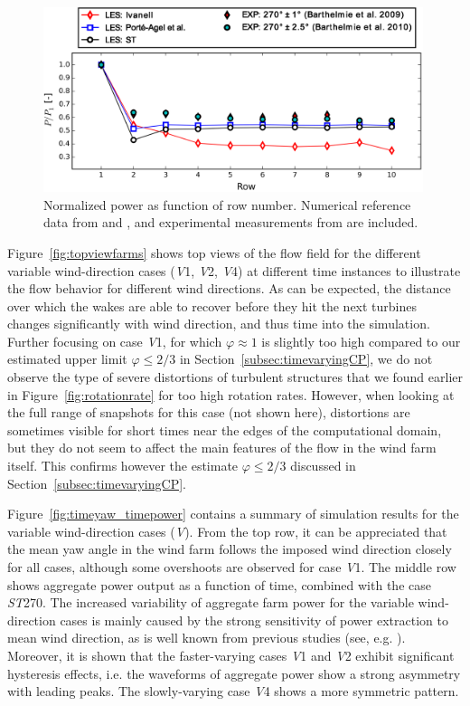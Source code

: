 		\begin{figure}[ht]
			\centering
			\includegraphics[width=0.99\textwidth]{chapters/turbulent_inflow/blm/figure10.eps}
			\caption{Normalized power as function of row number.
				Numerical reference data from \cite{ivanell2009numerical} and \cite{porte2013numerical}, and experimental measurements from \cite{barthelmie2009modelling, barthelmie2010quantifying} are included. }
			\label{fig:hornsrevsteady}
		\end{figure}
		
		Figure~\ref{fig:topviewfarms} shows top views of the flow field for the different variable wind-direction cases (\emph{V}1, \emph{V}2, \emph{V}4) at different time instances to illustrate the flow behavior for different wind directions. As can be expected, the distance over which the wakes are able to recover before they hit the next turbines changes significantly with wind direction, and thus time into the simulation. Further focusing on case \emph{V}1, for which $\varphi\approx 1$ is slightly too high compared to our estimated upper limit  $\varphi \leq 2/3$  in Section~\ref{subsec:timevaryingCP}, we do not observe the type of severe distortions of turbulent structures that we found earlier in Figure~\ref{fig:rotationrate} for too high rotation rates. However, when looking at the full range of snapshots for this case (not shown here), distortions are sometimes visible for short times near the edges of the computational domain, but they do not seem to affect the main features of the flow in the wind farm itself. This confirms however the estimate $\varphi \leq 2/3$ discussed in Section~\ref{subsec:timevaryingCP}.
		
		Figure~\ref{fig:timeyaw_timepower} contains a summary of simulation results for the variable wind-direction cases (\emph{V}). From the
		top row, it can be appreciated that the mean yaw angle in the wind farm follows the imposed  wind direction closely for all cases,
		although some overshoots are observed for case \emph{V}1. The middle row shows aggregate power output as a function of time, combined
		with the case \emph{ST}270. The increased variability of aggregate farm power for the variable wind-direction cases is mainly caused
		by the strong sensitivity of power extraction to mean wind direction, as is well known from previous studies (see, e.g. \citealp{barthelmie2010quantifying, porte2013numerical}). Moreover, it is shown that the faster-varying cases \emph{V}1 and \emph{V}2 exhibit significant hysteresis effects, i.e. the waveforms of aggregate power show a strong asymmetry with leading peaks. The slowly-varying case \emph{V}4 shows a more symmetric pattern.
		

